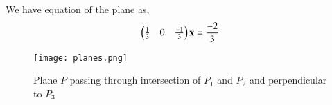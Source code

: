 \documentclass[journal,12pt,twocolumn]{IEEEtran}
\begin{document}
We have equation of the plane as,
\begin{align}
    \begin{pmatrix}\frac{1}{3}&0&\frac{-1}{3}\end{pmatrix}\mathbf{x} = \frac{-2}{3} 
\end{align}
\begin{figure}[!ht]
\texttt{[image: planes.png]}
\caption{Plane $P$ passing through intersection of $P_{1}$ and $P_{2}$ and perpendicular to $P_{3}$}
\label{fig:Line }	
\end{figure}
\end{document}
